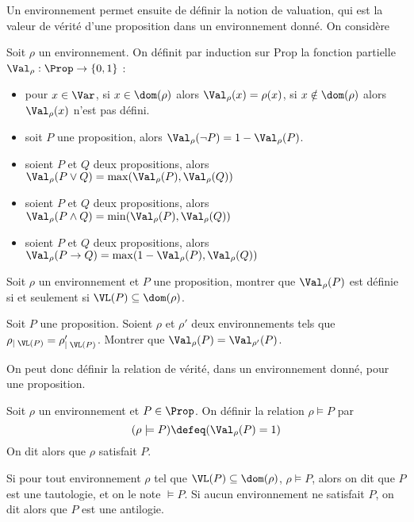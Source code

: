 Un environnement permet ensuite de définir la notion de valuation, qui est la
valeur de vérité d'une proposition dans un environnement donné. On considère

\begin{definition}[Valuation]
  Soit $\rho$ un environnement. On définit par induction sur $\mathrm{Prop}$
  la fonction partielle $\Val_\rho : \Prop \to \{0,1\}$ :
  \begin{itemize}
  \item pour $x\in \Var$, si $x\in \dom(\rho)$ alors
    $\Val_\rho (x)= \rho(x)$, si $x\notin \dom(\rho)$ alors
    $\Val_\rho (x)$ n'est pas défini.
  \item soit $P$ une proposition, alors
    $\Val_\rho(\lnot P) = 1 - \Val_\rho(P)$.
  \item soient $P$ et $Q$ deux propositions, alors
    $\Val_\rho(P\lor Q)=\max(\Val_\rho(P),\Val_\rho(Q))$
  \item soient $P$ et $Q$ deux propositions, alors
    $\Val_\rho(P\land Q)=\min(\Val_\rho(P),\Val_\rho(Q))$
  \item soient $P$ et $Q$ deux propositions, alors
    $\Val_\rho(P\to Q) = \max(1 - \Val_\rho(P),\Val_\rho(Q))$
  \end{itemize}
\end{definition}

\begin{exercise}
  Soit $\rho$ un environnement et $P$ une proposition, montrer que
  $\Val_\rho(P)$ est définie si et seulement si
  $\VL(P)\subseteq \dom(\rho)$.
\end{exercise}

\begin{exercise}\label{exo:val_VL}
  Soit $P$ une proposition. Soient $\rho$ et $\rho'$ deux environnements tels
  que $\rho_{|\;\VL(P)}=\rho'_{|\;\VL(P)}$. Montrer que
  $\Val_\rho(P)=\Val_{\rho'}(P)$.
\end{exercise}

On peut donc définir la relation de vérité, dans un environnement donné, pour
une proposition.

\begin{definition}[Satisfaction]
  Soit $\rho$ un environnement et $P\in\Prop$. On définir la relation
  $\rho\models P$ par $$(\rho\models P) \defeq (\Val_\rho(P) = 1)$$
  On dit alors que $\rho$ satisfait $P$.

  Si pour tout environnement $\rho$ tel que $\VL(P)\subseteq\dom(\rho)$,
  $\rho\models P$, alors on dit que $P$ est une tautologie, et on le note
  $\models P$. Si aucun environnement ne satisfait $P$, on dit alors que $P$ est
  une antilogie.
\end{definition}

